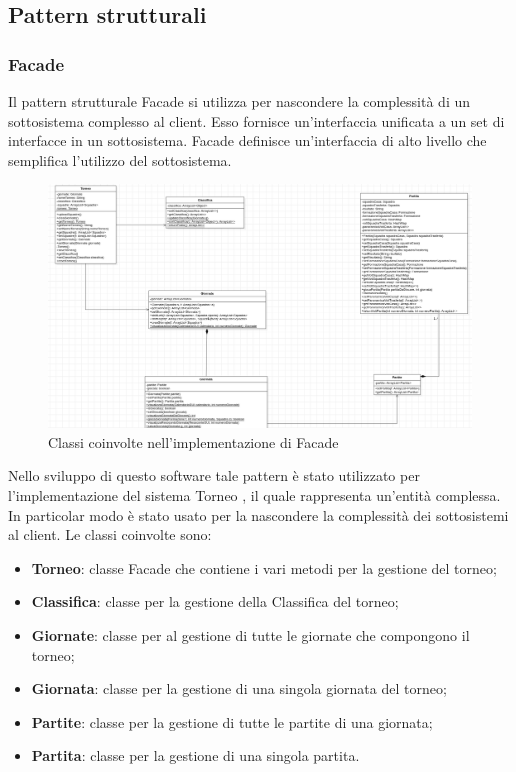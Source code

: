 \documentclass[12pt,a4paper]{article}
\begin{document}
\subsection{Pattern strutturali}
\subsubsection{Facade}
Il pattern strutturale Facade si utilizza per nascondere la complessità di un sottosistema complesso al client. Esso fornisce un'interfaccia unificata a un set di interfacce in un sottosistema. Facade definisce un'interfaccia di alto livello che semplifica l'utilizzo del sottosistema.
\begin{figure}[h]
\centering
\includegraphics[width=16 cm ,keepaspectratio]{Facade.png}
\caption{Classi coinvolte nell'implementazione di Facade}
\end{figure}
\newline
Nello sviluppo di questo software tale pattern è stato utilizzato per l'implementazione del sistema Torneo , il quale rappresenta un'entità complessa. In particolar modo è stato usato per la nascondere la complessità dei sottosistemi al client. Le classi coinvolte sono:
\begin{itemize}
\item \textbf{Torneo}: classe Facade che contiene i vari metodi per la gestione del torneo;
\item \textbf{Classifica}: classe per la gestione della Classifica del torneo;
\item \textbf{Giornate}: classe per al gestione di tutte le giornate che compongono il torneo;
\item \textbf{Giornata}: classe per la gestione di una singola giornata del torneo;
\item \textbf{Partite}: classe per la gestione di tutte le partite di una giornata;
\item \textbf{Partita}: classe per la gestione di una singola partita.
\end{itemize}
\newpage
\end{document}

